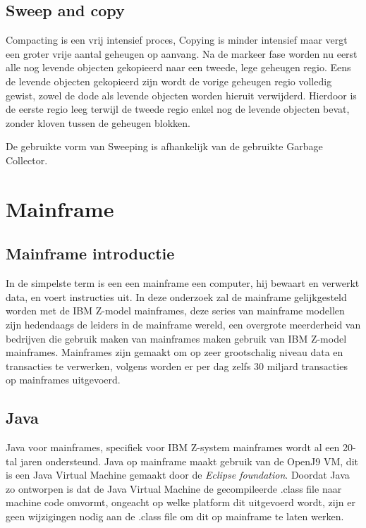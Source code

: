 \subsection{Sweep and copy}
Compacting is een vrij intensief proces, Copying is minder intensief maar vergt een groter vrije aantal geheugen op aanvang.
Na de markeer fase worden nu eerst alle nog levende objecten gekopieerd naar een tweede, lege geheugen regio.
Eens de levende objecten gekopieerd zijn wordt de vorige geheugen regio volledig gewist, zowel de dode als levende objecten worden hieruit verwijderd.
Hierdoor is de eerste regio leeg terwijl de tweede regio enkel nog de levende objecten bevat, zonder kloven tussen de geheugen blokken.

De gebruikte vorm van Sweeping is afhankelijk van de gebruikte Garbage Collector.
\autocite{Putten2022}


\section{Mainframe}
\label{sec:mainframe}
\subsection{Mainframe introductie}
\label{sec:mainframe introductie}

In de simpelste term is een een mainframe een computer, hij bewaart en verwerkt data, en voert instructies uit.
In deze onderzoek zal de mainframe gelijkgesteld worden met de IBM Z-model mainframes, deze series van mainframe modellen zijn hedendaags de leiders in de mainframe wereld, een overgrote meerderheid van bedrijven die gebruik maken van mainframes maken gebruik van IBM Z-model mainframes.
Mainframes zijn gemaakt om op zeer grootschalig niveau data en transacties te verwerken, volgens \textcite{Critchley2021} worden er per dag zelfs 30 miljard transacties op mainframes uitgevoerd. %



\subsection{Java}
\label{sec:mainframe java}
Java voor mainframes, specifiek voor IBM Z-system mainframes wordt al een 20-tal jaren ondersteund.%
Java op mainframe maakt gebruik van de OpenJ9 VM, dit is een Java Virtual Machine gemaakt door de \textit{Eclipse foundation}.
Doordat Java zo ontworpen is dat de Java Virtual Machine de gecompileerde .class file naar machine code omvormt, ongeacht op welke platform dit uitgevoerd wordt, zijn er geen wijzigingen nodig aan de .class file om dit op mainframe te laten werken.


